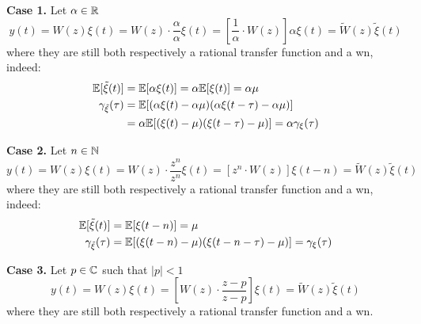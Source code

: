 \textbf{Case 1.}
Let $\alpha \in \mathbb{R}$
\[
	y(t)=W(z) \xi(t)=W(z) \cdot \frac{\alpha}{\alpha} \xi(t)=\left[\frac{1}{\alpha} \cdot W(z)\right] \alpha \xi(t)=\tilde{W}(z) \tilde{\xi}(t)
\]
where they are still both respectively a rational transfer function and a \gls{wn}, indeed:
\begin{align*}
	\mathbb{E}[\tilde{\xi}(t)]&=\mathbb{E}[\alpha \xi(t)]=\alpha \mathbb{E}[\xi(t)]=\alpha \mu\\
	\gamma_{\tilde{\xi}}(\tau)&=\mathbb{E}[(\alpha\xi(t)-\alpha\mu)(\alpha \xi(t-\tau)-\alpha \mu)]\\
	&=\alpha \mathbb{E}[(\xi(t)-\mu)( \xi(t-\tau)- \mu)] = \alpha \gamma_{\xi}(\tau)
\end{align*}

\textbf{Case 2.}
Let $n \in \mathbb{N}$
\[
	y(t)=W(z) \xi(t)=W(z) \cdot \frac{z^{n}}{z^{n}} \xi(t)=\left[z^{n} \cdot W(z)\right] \xi(t-n)=\tilde{W}(z) \tilde{\xi}(t)
\]
where they are still both respectively a rational transfer function and a \gls{wn}, indeed:
\begin{align*}
	\mathbb{E}[\tilde{\xi}(t)]&=\mathbb{E}[\xi(t-n)]=\mu \\
	\gamma_{\tilde{\xi}}(\tau)&=\mathbb{E}[(\xi(t-n)-\mu)(\xi(t-n-\tau)-\mu)]=\gamma_{\xi}(\tau)
\end{align*}

\textbf{Case 3.}
Let $p \in \mathbb{C}$ such that $|p|<1$
\[
	y(t)=W(z) \xi(t)=\left[W(z) \cdot \frac{z-p}{z-p}\right] \xi(t)=\tilde{W}(z) \tilde{\xi}(t)
\]
where they are still both respectively a rational transfer function and a \gls{wn}.

